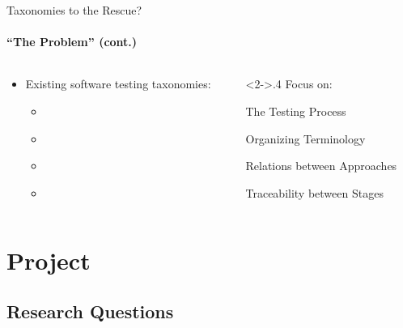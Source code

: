 \documentclass{beamer}
\begin{document}
\begin{frame}{Taxonomies to the Rescue?}
    \framesubtitle{``The Problem'' (cont.)}
    \begin{columns}[T]
        \begin{column}{.6\textwidth}
            \begin{itemize}
                \item Existing software testing taxonomies:
                      \begin{itemize}
                          \item \citet{TebesEtAl2020a}
                          \item \citet{SouzaEtAl2017}
                          \item \citet{Firesmith2015}
                          \item \citet{UnterkalmsteinerEtAl2014}
                      \end{itemize}
            \end{itemize}
        \end{column}
        \begin{column}<2->{.4\textwidth}
            \centering
            \vspace{1.5mm}
            Focus on:
            \vspace{0.5mm}

            \small The Testing Process

            Organizing Terminology

            Relations between Approaches

            Traceability between Stages
        \end{column}
    \end{columns}
\end{frame}


\section{Project}
\subsection{Research Questions}

\def\rqa{\begin{alertblock}{Research Question 1}
        \rqatext{}
    \end{alertblock}
}
\end{document}
